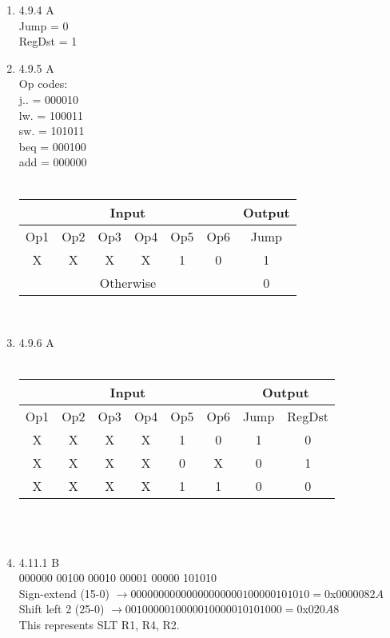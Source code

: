 \documentclass[12pt]{article}
\begin{document}
\begin{enumerate}
\item 4.9.4 A \\
Jump = 0 \\
RegDst = 1
\\

\item 4.9.5 A \\ 
Op codes: \\
j.. = 000010 \\
lw. = 100011 \\
sw. = 101011 \\
beq = 000100 \\
add = 000000 \\
\\
\begin{tabular}{|c| c| c| c| c| c |c|}
\hline
\multicolumn{6}{|c|}{Input} & Output \\
\hline
Op1 & Op2 & Op3 & Op4 & Op5 & Op6 & Jump\\
\hline
X & X & X & X & 1 & 0 & 1 \\
\hline
\multicolumn{6}{|c|}{Otherwise} & 0 \\
\hline
\end{tabular} 
\\

\item 4.9.6 A \\
\\
\begin{tabular}{|c| c| c| c| c| c |c| c|}
\hline
\multicolumn{6}{|c|}{Input} & \multicolumn{2}{|c|}{Output} \\
\hline
Op1 & Op2 & Op3 & Op4 & Op5 & Op6 & Jump & RegDst\\
\hline
X & X & X & X & 1 & 0 & 1 & 0 \\
\hline
X & X & X & X & 0 & X & 0 & 1 \\
\hline
X & X & X & X & 1 & 1 & 0 & 0 \\
\hline
\end{tabular} \\
\\
\item 4.11.1 B \\
000000 00100 00010 00001 00000 101010 \\
Sign-extend (15-0) $\rightarrow 0000 0000 0000 0000 0000 1000 0010 1010 = 0$x$0000082A$ \\
Shift left 2 (25-0) $\rightarrow  00100 00010 00001 00000 101010 00  = 0$x$020A8$
\\
This represents SLT R1, R4, R2. \\


\end{enumerate}
\end{document}
